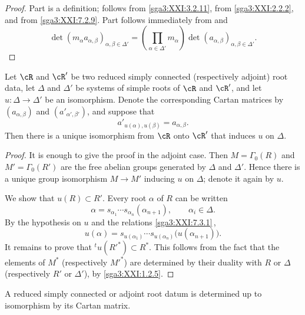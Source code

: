 \begin{proof}
Part  is a definition;  follows from
\ref{sga3:XXI:3.2.11},  from \ref{sga3:XXI:2.2.2}, and
 from \ref{sga3:XXI:7.2.9}.  Part  follows immediately
from  and
\[
 \det(m_\alpha a_{\alpha,\beta})_{\alpha,\beta\in\Delta'}
 =
 \left(\prod_{\alpha\in\Delta'}m_\alpha\right)
 \det(a_{\alpha,\beta})_{\alpha,\beta\in\Delta'}.
\]
\end{proof}

\begin{proposition}\label{sga3:XXI:7.3.2}
Let \(\cR\) and \(\cR'\) be two reduced simply connected
(respectively adjoint) root data, let \(\Delta\) and \(\Delta'\)
be systems of simple roots of \(\cR\) and \(\cR'\), and let
\(u:\Delta\to\Delta'\) be an isomorphism.  Denote the corresponding
Cartan matrices by \((a_{\alpha,\beta})\) and
\((a'_{\alpha',\beta'})\), and suppose that
\[
 a'_{u(\alpha),u(\beta)}=a_{\alpha,\beta}.
\]
Then there is a unique isomorphism from \(\cR\) onto \(\cR'\)
that induces \(u\) on \(\Delta\).
\end{proposition}

\begin{proof}
It is enough to give the proof in the adjoint case.  Then
\(M=\Gamma_0(R)\) and \(M'=\Gamma_0(R')\) are the free abelian
groups generated by \(\Delta\) and \(\Delta'\).  Hence there is a
unique group isomorphism \(M\to M'\) inducing \(u\) on \(\Delta\);
denote it again by \(u\).

We show that \(u(R)\subset R'\).  Every root \(\alpha\) of \(R\)
can be written
\[
 \alpha=s_{\alpha_1}\cdots s_{\alpha_n}(\alpha_{n+1}),
 \qquad \alpha_i\in\Delta.
\]
By the hypothesis on \(u\) and the relations
\ref{sga3:XXI:7.3.1}\,,
\[
 u(\alpha)=
 s_{u(\alpha_1)}\cdots s_{u(\alpha_n)}
 \bigl(u(\alpha_{n+1})\bigr).
\]
It remains to prove that \({}^tu(R'^\ast)\subset R^\ast\).  This
follows from the fact that the elements of \(M^\ast\)
(respectively \(M'^\ast\)) are determined by their duality with
\(R\) or \(\Delta\) (respectively \(R'\) or \(\Delta'\)), by
\ref{sga3:XXI:1.2.5}.
\end{proof}

\begin{corollary}\label{sga3:XXI:7.3.3}
A reduced simply connected or adjoint root datum is determined up
to isomorphism by its Cartan matrix.
\end{corollary}

